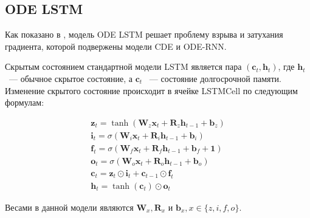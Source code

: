 \documentclass{article}
\newcommand{\bb}{\mathbf{b}}
\newcommand{\W}{\mathbf{W}}
\newcommand{\x}{\mathbf{x}}
\newcommand{\cc}{\mathbf{c}}
\newcommand{\h}{\mathbf{h}}
\begin{document}





\subsection{ODE LSTM}

Как показано в \cite{lechner2020longterm}, модель ODE LSTM решает проблему взрыва и затухания градиента, которой подвержены модели CDE и ODE-RNN.

Скрытым состоянием стандартной модели LSTM является пара $(\mathbf{c}_t, \mathbf{h}_t)$, где $\mathbf{h}_t$ ~--- обычное скрытое состояние, а $\mathbf{c}_t$ ~--- состояние долгосрочной памяти. Изменение скрытого состояние происходит в ячейке LSTMCell по следующим формулам:

\begin{equation*}
\begin{array}{l}

\mathbf{z}_{t}=\tanh \left(\W_{z} \x_{t}+\mathbf{R}_{z} \h_{t-1}+\bb_{z}\right)\\
\mathbf{i}_{t}=\sigma\left(\W_{i} \x_{t}+\mathbf{R}_{i} \h_{t-1}+\bb_{i}\right)\\
\mathbf{f}_{t}=\sigma\left(\W_{f} \x_{t}+\mathbf{R}_{f} \h_{t-1}+\bb_{f}+\mathbf{1}\right)\\
\mathbf{o}_{t}=\sigma\left(\W_{o} \x_{t}+\mathbf{R}_{o} \h_{t-1}+\bb_{o}\right)\\
\cc_{t}=\mathbf{z}_{t} \odot \mathbf{i}_{t}+\cc_{t-1} \odot \mathbf{f}_{t} \\
\h_{t}=\tanh \left(\cc_{t}\right) \odot \mathbf{o}_{t}
\end{array}
\end{equation*}

Весами в данной модели являются $\mathbf{W}_x, \mathbf{R}_x$ и $\mathbf{b}_x, x\in \{z, i, f, o\}$. 
\end{document}
